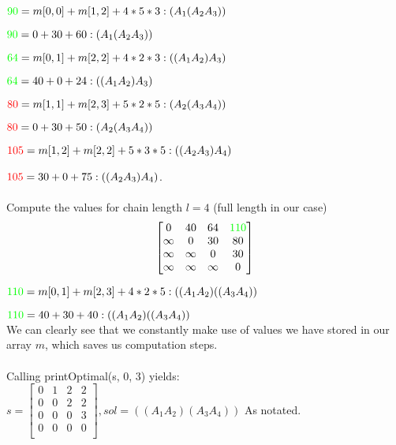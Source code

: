$\textcolor{green}{90} = m[0,0] + m[1,2] + 4*5*3 : (A_1(A_{2}A_{3}))$

$\textcolor{green}{90} = 0 + 30  + 60 : (A_1(A_{2}A_{3}))$

$\textcolor{green}{64} = m[0,1] + m[2,2] + 4*2*3 : ((A_{1}A_{2})A_{3})$

$\textcolor{green}{64} = 40 + 0 + 24 : ((A_{1}A_{2})A_{3})$

$\textcolor{red}{80} = m[1, 1] + m[2,3] + 5*2*5 : (A_2(A_{3}A_{4}))$

$\textcolor{red}{80} = 0 + 30 + 50 : (A_2(A_{3}A_{4}))$

$\textcolor{red}{105} = m[1, 2] + m[2,2] + 5*3*5 : ((A_{2}A_{3})A_{4})$

$\textcolor{red}{105} = 30 + 0 + 75 : ((A_{2}A_{3})A_{4})$.
\\
\\
Compute the values for chain length $l = 4$ (full length in our case)
\[
  \begin{bmatrix}
    0 & 40 & 64 & \textcolor{green}{110} \\
    \infty & 0 & 30  & 80 \\
    \infty & \infty & 0 & 30 \\
    \infty & \infty & \infty & 0 \\
  \end{bmatrix}
\]

$\textcolor{green}{110} =  m[0,1] + m[2,3] + 4*2*5 : ((A_{1}A_{2})((A_{3}A_{4})) $

$\textcolor{green}{110} =  40 + 30 +  40 : ((A_{1}A_{2})((A_{3}A_{4})) $
\\
We can clearly see that we constantly make use of values we have stored in our array $m$, which saves us computation steps.
\\
\\
Calling printOptimal(s, 0, 3) yields:
\space{0.3em}
$ s = \begin{bmatrix}
    0 & 1 & 2 & 2 \\
    0 & 0 & 2  & 2 \\
    0 & 0 & 0 & 3 \\
    0 & 0 & 0 & 0 \\
  \end{bmatrix},
  sol = ((A_{1}A_{2})(A_{3}A_{4}))$
\vspace{0.3em}
As notated.
